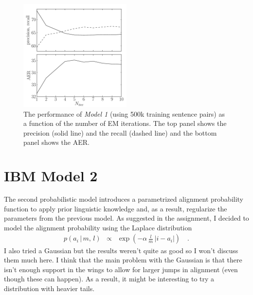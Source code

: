 \documentclass[11pt]{article}
\newcommand{\eqlabel}[1]{\label{eq:#1}}
\newcommand{\figlabel}[1]{\label{fig:#1}}
\begin{document}
\begin{figure}[htbp]
\begin{center}
    \includegraphics[width=0.5\textwidth]{model1_convergence.pdf}
\end{center}
\caption{%
The performance of \emph{Model 1} (using 500k training sentence pairs) as a
function of the number of EM iterations.
The top panel shows the precision (solid line) and the recall (dashed line)
and the bottom panel shows the AER.
\figlabel{model1-convergence}}
\end{figure}

\section{IBM Model 2}

The second probabilistic model introduces a parametrized alignment probability
function to apply prior linguistic knowledge and, as a result, regularize the
parameters from the previous model.
As suggested in the assignment, I decided to model the alignment probability
using the Laplace distribution
\begin{eqnarray}\eqlabel{model2-prob}
p(a_i\,|\,m,\,l) &\propto& \exp \left ( -\alpha\,\frac{l}{m} \,
                                        \left | i - a_i \right | \right )
        \quad.
\end{eqnarray}
I also tried a Gaussian but the results weren't quite as good so I won't
discuss them much here.
I think that the main problem with the Gaussian is that there isn't enough
support in the wings to allow for larger jumps in alignment (even though these
can happen).
As a result, it might be interesting to try a distribution with heavier tails.
\end{document}
